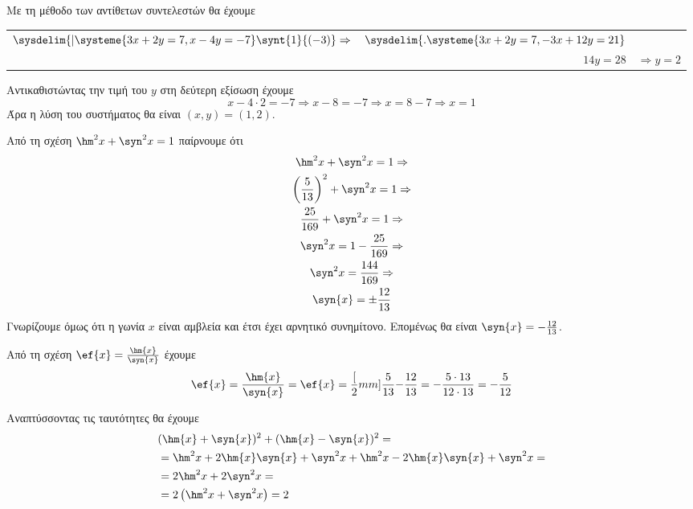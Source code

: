 \documentclass[twoside,nofonts,internet,math,spyros]{frontisthrio-diag}
\begin{document}
\begin{thema}
\begin{erwthma}
\item Με τη μέθοδο των αντίθετων συντελεστών θα έχουμε
\begin{center}
\begin{tabular}{lrr}
$ \displaystyle\sysdelim\{|\systeme{3x+2y=7,x-4y=-7}\synt{1}{(-3)}\Rightarrow $ & $ \sysdelim\{.\systeme{3x+2y=7,-3x+12y=21} $  &  \\ 
\hhline{~-~}& $ 14y=28 $ & $ \Rightarrow y=2 $
\end{tabular}
\end{center}
Αντικαθιστώντας την τιμή του $ y $ στη δεύτερη εξίσωση έχουμε
\[ x-4\cdot 2=-7\Rightarrow x-8=-7\Rightarrow x=8-7\Rightarrow x=1 \]
Άρα η λύση του συστήματος θα είναι $ (x,y)=(1,2) $.
\item 
\begin{rlist}
\item Από τη σχέση $ \hm^2{x}+\syn^2{x}=1 $ παίρνουμε ότι
\begin{gather*}
\hm^2{x}+\syn^2{x}=1\Rightarrow\\
\left( \frac{5}{13}\right)^2+\syn^2{x}=1\Rightarrow\\
\frac{25}{169}+\syn^2{x}=1\Rightarrow\\
\syn^2{x}=1-\frac{25}{169}\Rightarrow\\
\syn^2{x}=\frac{144}{169}\Rightarrow\\
\syn{x}=\pm\frac{12}{13}
\end{gather*}
Γνωρίζουμε όμως ότι η γωνία $ x $ είναι αμβλεία και έτσι έχει αρνητικό συνημίτονο. Επομένως θα είναι $ \syn{x}=-\frac{12}{13} $.
\item Από τη σχέση $ \ef{x}=\frac{\hm{x}}{\syn{x}} $ έχουμε
\[ \ef{x}=\frac{\hm{x}}{\syn{x}}=\ef{x}=\frac[2mm]{\frac{5}{13}}{-\frac{12}{13}}=-\frac{5\cdot 13}{12\cdot 13}=-\frac{5}{12} \]
\end{rlist}
\item Αναπτύσσοντας τις ταυτότητες θα έχουμε
\begin{align*}
&(\hm{x}+\syn{x})^2+(\hm{x}-\syn{x})^2=\\
&=\hm^2{x}+2\hm{x}\syn{x}+\syn^2{x}+\hm^2{x}-2\hm{x}\syn{x}+\syn^2{x}=\\
&=2\hm^2{x}+2\syn^2{x}=\\
&=2\left( \hm^2{x}+\syn^2{x}\right) =2
\end{align*}
\end{erwthma}
\item\mbox{}\\
\begin{erwthma}
\item\mbox{}\\\vspace{-11mm}

\end{erwthma}
\end{thema}
\end{document}
